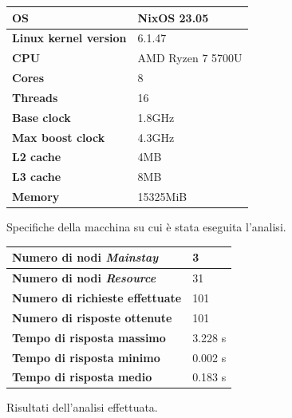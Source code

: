 \documentclass{scrartcl}
\begin{document}
\begin{figure}[H]
    \caption{Specifiche della macchina su cui è stata eseguita l'analisi.}
    \begin{center}
        \begin{tabular}{ | l | l | }
            \hline
            \textbf{OS}                   & NixOS 23.05       \\
            \hline
            \textbf{Linux kernel version} & 6.1.47            \\
            \hline
            \textbf{CPU}                  & AMD Ryzen 7 5700U \\
            \hline
            \textbf{Cores}                & 8                 \\
            \hline
            \textbf{Threads}              & 16                \\
            \hline
            \textbf{Base clock}           & 1.8GHz            \\
            \hline
            \textbf{Max boost clock}      & 4.3GHz            \\
            \hline
            \textbf{L2 cache}             & 4MB               \\
            \hline
            \textbf{L3 cache}             & 8MB               \\
            \hline
            \textbf{Memory}               & 15325MiB          \\
            \hline
        \end{tabular}
    \end{center}
    \label{tab:machine-specs}
\end{figure}

\begin{figure}[H]
    \caption{Risultati dell'analisi effettuata.}
    \begin{center}
        \begin{tabular}{ | l | l | }
            \hline
            \textbf{Numero di nodi \textit{Mainstay}} & 3       \\
            \hline
            \textbf{Numero di nodi \textit{Resource}} & 31      \\
            \hline
            \textbf{Numero di richieste effettuate}   & 101     \\
            \hline
            \textbf{Numero di risposte ottenute}      & 101     \\
            \hline
            \textbf{Tempo di risposta massimo}        & 3.228 s \\
            \hline
            \textbf{Tempo di risposta minimo}         & 0.002 s \\
            \hline
            \textbf{Tempo di risposta medio}          & 0.183 s \\
            \hline
        \end{tabular}
    \end{center}
    \label{tab:analysis-specs}
\end{figure}
\end{document}
